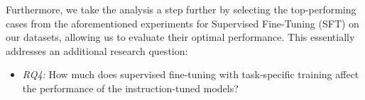 Furthermore, we take the analysis a step further by selecting the top-performing cases from the aforementioned experiments for Supervised Fine-Tuning (SFT) on our datasets, allowing us to evaluate their optimal performance. This essentially addresses an additional research question:

\begin{itemize}[nosep,topsep=1pt]
    \item \textit{RQ4:} How much does supervised fine-tuning with task-specific training affect the performance of the instruction-tuned models?
\end{itemize}

